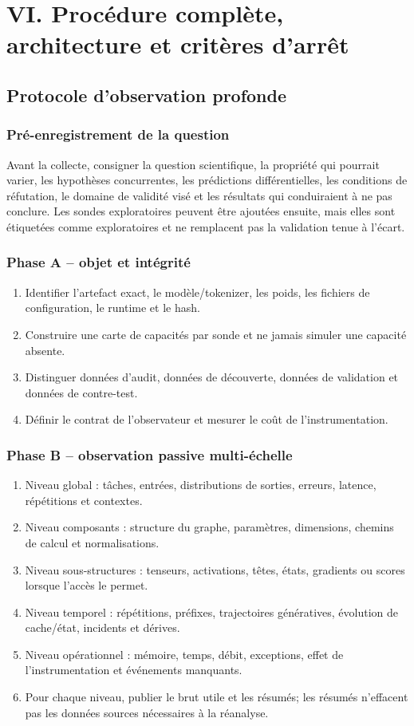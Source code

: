 \documentclass[11pt,oneside]{book}
\theoremstyle{definition}
\theoremstyle{remark}
\newcommand{\1}{\mathbf 1}
\begin{document}
\part{VI. Procédure complète, architecture et critères d’arrêt}

\chapter{Protocole d'observation profonde}
\section{Pré-enregistrement de la question}
Avant la collecte, consigner la question scientifique, la propriété qui pourrait varier, les hypothèses concurrentes, les prédictions différentielles, les conditions de réfutation, le domaine de validité visé et les résultats qui conduiraient à ne pas conclure. Les sondes exploratoires peuvent être ajoutées ensuite, mais elles sont étiquetées comme exploratoires et ne remplacent pas la validation tenue à l'écart.

\section{Phase A -- objet et intégrité}
\begin{enumerate}
\item Identifier l'artefact exact, le modèle/tokenizer, les poids, les fichiers de configuration, le runtime et le hash.
\item Construire une carte de capacités par sonde et ne jamais simuler une capacité absente.
\item Distinguer données d'audit, données de découverte, données de validation et données de contre-test.
\item Définir le contrat de l'observateur et mesurer le coût de l'instrumentation.
\end{enumerate}

\section{Phase B -- observation passive multi-échelle}
\begin{enumerate}
\item Niveau global : tâches, entrées, distributions de sorties, erreurs, latence, répétitions et contextes.
\item Niveau composants : structure du graphe, paramètres, dimensions, chemins de calcul et normalisations.
\item Niveau sous-structures : tenseurs, activations, têtes, états, gradients ou scores lorsque l'accès le permet.
\item Niveau temporel : répétitions, préfixes, trajectoires génératives, évolution de cache/état, incidents et dérives.
\item Niveau opérationnel : mémoire, temps, débit, exceptions, effet de l'instrumentation et événements manquants.
\item Pour chaque niveau, publier le brut utile et les résumés; les résumés n'effacent pas les données sources nécessaires à la réanalyse.
\end{enumerate}
\end{document}

